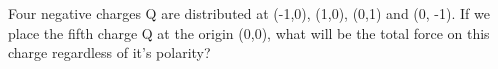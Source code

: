\documentclass{ximera}
\begin{document}
\begin{question}  
  Four negative charges Q are distributed at (-1,0), (1,0), (0,1) and (0, -1). If we place the fifth charge Q at the origin (0,0), what will be the total force on this charge regardless of it's polarity?  
  \begin{multipleChoice}  
  \end{multipleChoice}  
\end{question}
\end{document}
